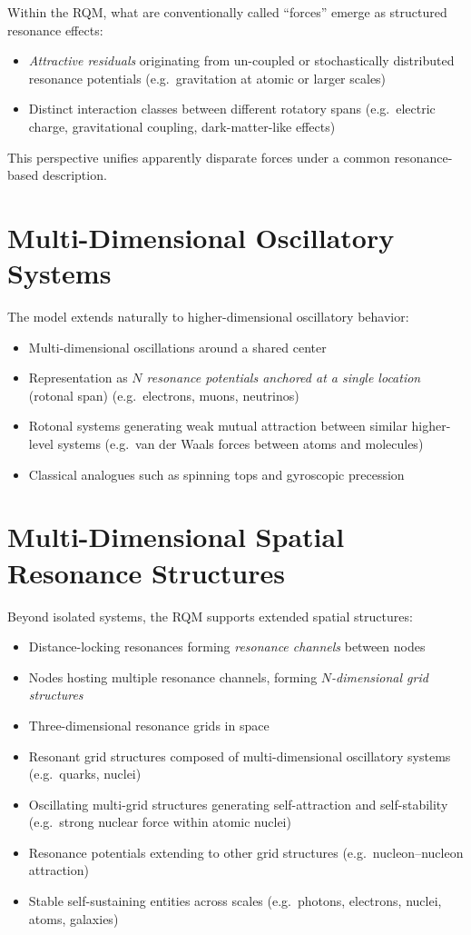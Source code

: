Within the RQM, what are conventionally called ``forces'' emerge as structured resonance effects:

\begin{itemize}
  \item \emph{Attractive residuals} originating from un-coupled or stochastically distributed resonance potentials (e.g.\ gravitation at atomic or larger scales)
  \item Distinct interaction classes between different rotatory spans (e.g.\ electric charge, gravitational coupling, dark-matter-like effects)
\end{itemize}

This perspective unifies apparently disparate forces under a common resonance-based description.

\section{Multi-Dimensional Oscillatory Systems}

The model extends naturally to higher-dimensional oscillatory behavior:

\begin{itemize}
  \item Multi-dimensional oscillations around a shared center
  \item Representation as \emph{$N$ resonance potentials anchored at a single location} (rotonal span) (e.g.\ electrons, muons, neutrinos)
  \item Rotonal systems generating weak mutual attraction between similar higher-level systems (e.g.\ van der Waals forces between atoms and molecules)
  \item Classical analogues such as spinning tops and gyroscopic precession
\end{itemize}

\section{Multi-Dimensional Spatial Resonance Structures}

Beyond isolated systems, the RQM supports extended spatial structures:

\begin{itemize}
  \item Distance-locking resonances forming \emph{resonance channels} between nodes
  \item Nodes hosting multiple resonance channels, forming \emph{$N$-dimensional grid structures}
  \item Three-dimensional resonance grids in space
  \item Resonant grid structures composed of multi-dimensional oscillatory systems (e.g.\ quarks, nuclei)
  \item Oscillating multi-grid structures generating self-attraction and self-stability (e.g.\ strong nuclear force within atomic nuclei)
  \item Resonance potentials extending to other grid structures (e.g.\ nucleon--nucleon attraction)
  \item Stable self-sustaining entities across scales (e.g.\ photons, electrons, nuclei, atoms, galaxies)
\end{itemize}

